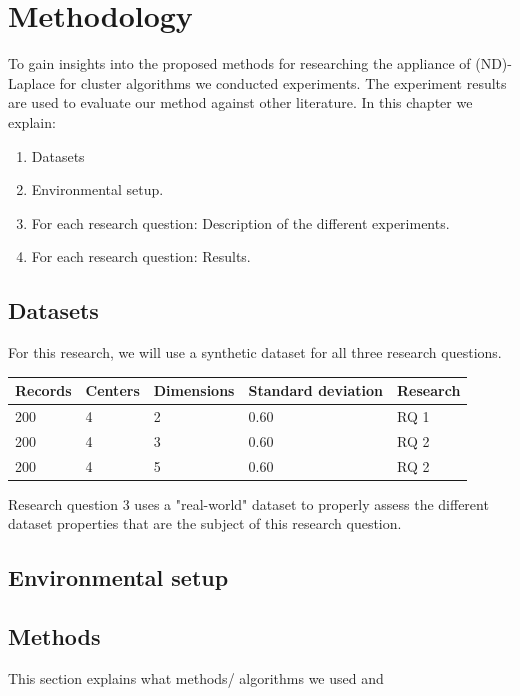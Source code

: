 \chapter{Methodology}

To gain insights into the proposed methods for researching the appliance of (ND)-Laplace for cluster algorithms we conducted experiments.
The experiment results are used to evaluate our method against other literature.
In this chapter we explain:
\begin{enumerate}

  \item Datasets
  \item Environmental setup.
  \item For each research question: Description of the different experiments.
  \item For each research question: Results.
\end{enumerate}

\section{Datasets}
For this research, we will use a synthetic dataset for all three research questions.
\begin{table}[h]
  \begin{tabular}{@{}lllll@{}}
    \toprule
    Records & Centers & Dimensions & Standard deviation & Research \\ \midrule
    200     & 4       & 2          & 0.60               & RQ 1     \\ \bottomrule
    200     & 4       & 3          & 0.60               & RQ 2     \\ \bottomrule
    200     & 4       & 5          & 0.60               & RQ 2     \\ \bottomrule
  \end{tabular}
\end{table}

Research question 3 uses a "real-world" dataset to properly assess the different dataset properties that are the subject of this research question.
\section{Environmental setup}
\section{Methods}
This section explains what methods/ algorithms we used and
